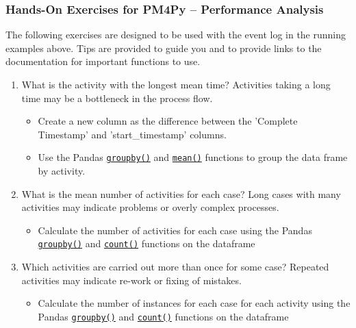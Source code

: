 \begin{tcolorbox}[colback=code]
\subsubsection*{Hands-On Exercises for PM4Py -- Performance Analysis}

The following exercises are designed to be used with the event log in the running examples above. Tips are provided to guide you and to provide links to the documentation for important functions to use.

\begin{enumerate}
   \item What is the activity with the longest mean time? Activities taking a long time may be a bottleneck in the process flow.
   \begin{itemize}
       \item Create a new column as the difference between the 'Complete Timestamp' and 'start\_timestamp' columns.
       \item Use the Pandas \href{https://pandas.pydata.org/docs/reference/api/pandas.DataFrame.groupby.html}{\texttt{groupby()}} and \href{https://pandas.pydata.org/docs/reference/api/pandas.DataFrame.mean.html}{\texttt{mean()}} functions to group the data frame by activity.
   \end{itemize}
   \item What is the mean number of activities for each case? Long cases with many activities may indicate problems or overly complex processes.
   \begin{itemize}
       \item Calculate the number of activities for each case using the Pandas \href{https://pandas.pydata.org/docs/reference/api/pandas.DataFrame.groupby.html}{\texttt{groupby()}} and \href{https://pandas.pydata.org/docs/reference/api/pandas.DataFrame.count.html}{\texttt{count()}} functions on the dataframe
   \end{itemize}
   \item Which activities are carried out more than once for some case? Repeated activities may indicate re-work or fixing of mistakes.
   \begin{itemize}
       \item Calculate the number of instances for each case for each activity using the Pandas \href{https://pandas.pydata.org/docs/reference/api/pandas.DataFrame.groupby.html}{\texttt{groupby()}} and \href{https://pandas.pydata.org/docs/reference/api/pandas.DataFrame.count.html}{\texttt{count()}} functions on the dataframe
   \end{itemize}
\end{enumerate}
\end{tcolorbox}


